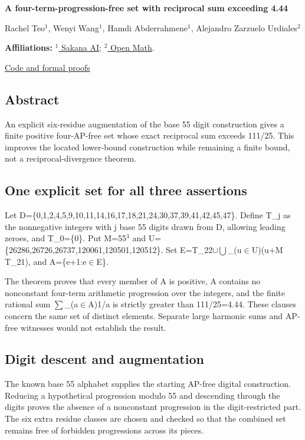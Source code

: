 \documentclass[11pt,a4paper]{article}
\begin{document}
{\LARGE\bfseries A four-term-progression-free set with reciprocal sum exceeding 4.44\par}\medskip
{\small Rachel Teo\ensuremath{^1}, Wenyi Wang\ensuremath{^1}, Hamdi Abderrahmene\ensuremath{^1}, Alejandro Zarzuelo Urdiales\ensuremath{^2}\par}\medskip
{\small\textbf{Affiliations:} \href{https://sakana.ai/}{\ensuremath{^1} Sakana AI}; \href{https://rsihouse.ai/openmath}{\ensuremath{^2} Open Math}.\par}

{\small\href{https://github.com/alejandrozu/openmath-2026-judging}{Code and formal proofs}\par}

\subsection{Abstract}
An explicit six-residue augmentation of the base 55 digit construction gives a finite positive four-AP-free set whose exact reciprocal sum exceeds 111/25. This improves the located lower-bound construction while remaining a finite bound, not a reciprocal-divergence theorem.

\subsection{One explicit set for all three assertions}
Let D=\{0,1,2,4,5,9,10,11,14,16,17,18,21,24,30,37,39,41,42,45,47\}. Define T\_j as the nonnegative integers with j base 55 digits drawn from D, allowing leading zeroes, and T\_0=\{0\}. Put M=55\ensuremath{^3} and U=\{26286,26726,26737,120061,120501,120512\}. Set E=T\_22\ensuremath{\cup}\ensuremath{\bigcup}\_(u\ensuremath{\in}U)(u+M T\_21), and A=\{e+1:e\ensuremath{\in}E\}.

The theorem proves that every member of A is positive, A contains no nonconstant four-term arithmetic progression over the integers, and the finite rational sum \ensuremath{\sum}\_(a\ensuremath{\in}A)1/a is strictly greater than 111/25=4.44. These clauses concern the same set of distinct elements. Separate large harmonic sums and AP-free witnesses would not establish the result.

\subsection{Digit descent and augmentation}
The known base 55 alphabet supplies the starting AP-free digital construction. Reducing a hypothetical progression modulo 55 and descending through the digits proves the absence of a nonconstant progression in the digit-restricted part. The six extra residue classes are chosen and checked so that the combined set remains free of forbidden progressions across its pieces.
\end{document}
